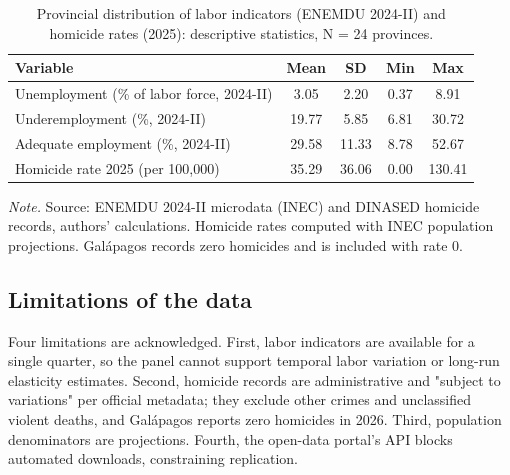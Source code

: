 \begin{table}[htbp]
  \centering
  \small
  \caption{Provincial distribution of labor indicators (ENEMDU 2024-II) and homicide rates (2025): descriptive statistics, N = 24 provinces.}
  \label{tab:descriptivos}
  \begin{tabular}{lcccc}
    \toprule
    Variable & Mean & SD & Min & Max \\
    \midrule
    Unemployment (\% of labor force, 2024-II) & 3.05 & 2.20 & 0.37 & 8.91 \\
    Underemployment (\%, 2024-II) & 19.77 & 5.85 & 6.81 & 30.72 \\
    Adequate employment (\%, 2024-II) & 29.58 & 11.33 & 8.78 & 52.67 \\
    Homicide rate 2025 (per 100,000) & 35.29 & 36.06 & 0.00 & 130.41 \\
    \bottomrule
  \end{tabular}
  \par\vspace{3pt}\noindent\small\textit{Note. }Source: ENEMDU 2024-II microdata (INEC) and DINASED homicide records, authors' calculations. Homicide rates computed with INEC population projections. Galápagos records zero homicides and is included with rate 0.
  
\end{table}



\subsection{Limitations of the data}



Four limitations are acknowledged. First, labor indicators are available for a single quarter, so the panel cannot support temporal labor variation or long-run elasticity estimates. Second, homicide records are administrative and "subject to variations" per official metadata; they exclude other crimes and unclassified violent deaths, and Galápagos reports zero homicides in 2026. Third, population denominators are projections. Fourth, the open-data portal's API blocks automated downloads, constraining replication.